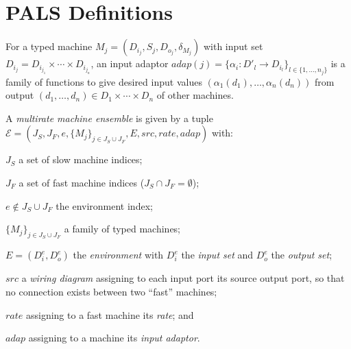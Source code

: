 

\section{PALS Definitions}
\label{sec:pals-defs}




\begin{definition}
 For a typed machine $M_j = (D_{i_j}, S_j, D_{o_j}, \delta_{M_j})$ with 
 input set $D_{i_j} = D_{i_{j_1}} \times \cdots \times D_{i_{j_n}}$, an input adaptor
 $\mathit{adap}(j)=\{\alpha_i: D'_l \rightarrow D_{i_l}\}_{l\in\{1,\ldots, n_j\}}$
 is a family of functions to give desired input values
 $(\alpha_1(d_1),\ldots,\alpha_n(d_n))$ %
 from output $(d_1,\ldots,d_n) \in D_1 \times \cdots \times D_n$ of other machines.  
\end{definition}


\begin{definition}
A \emph{multirate machine ensemble} is 
given by
a tuple
$\mathcal{E} = (J_S ,  J_F, e, \{M_j\}_{j\in J_S \cup J_F}, E, \mathit{src}, \mathit{rate}, \mathit{adap})$
with:
\begin{inparaenum}[(i)]
	\item $J_S$ a set of slow machine indices;
	\item $J_F$ a set of fast machine indices ($J_S \cap J_F = \emptyset$);
	\item $e\not\in J_S \cup J_F$ the environment index;
 	\item $\{M_j\}_{j\in J_S \cup J_F}$  a family of typed machines;
	\item $E=(D^e_i, D^e_o)$ 
	the \emph{environment} with $D^{e}_i$  the \emph{input set} and 
	$D^{e}_o$  the \emph{output set};
	\item $\mathit{src}$  a \emph{wiring diagram} assigning to each input port its source output port, 
	 so that no connection exists between two ``fast'' machines;
	\item $\mathit{rate}$ assigning to a fast 
	machine its \emph{rate};
	and
	\item $\mathit{adap}$ assigning to a machine its \emph{input adaptor}.
\end{inparaenum}
\end{definition}

